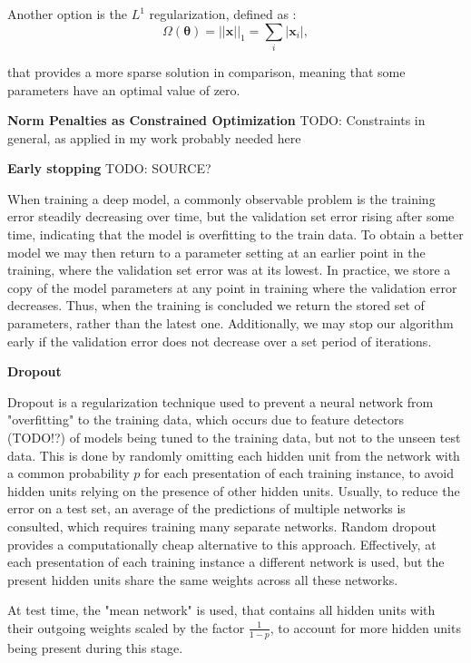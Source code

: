 Another option is the $L^1$ regularization, defined as :
\begin{equation}
    \Omega(\boldsymbol{\theta}) = ||\mathbf{x}||_1 = \sum_i |\mathbf{x}_i|,
\end{equation}

that provides a more sparse solution in comparison, meaning that some parameters have an optimal value of zero.


\textbf{Norm Penalties as Constrained Optimization}
TODO: Constraints in general, as applied in my work probably needed here

\textbf{Early stopping}
TODO: SOURCE?

When training a deep model, a commonly observable problem is the training error steadily decreasing over time, but the validation set error rising after some time, indicating that the model is overfitting to the train data. To obtain a better model we may then return to a parameter setting at an earlier point in the training, where the validation set error was at its lowest. In practice, we store a copy of the model parameters at any point in training where the validation error decreases. Thus, when the training is concluded we return the stored set of parameters, rather than the latest one. Additionally, we may stop our algorithm early if the validation error does not decrease over a set period of iterations.

\textbf{Dropout}

Dropout \cite{hinton2012improving} is a regularization technique used to prevent a neural network from "overfitting" to the training data, which occurs due to feature detectors (TODO!?) of models being tuned to the training data, but not to the unseen test data. This is done by randomly omitting each hidden unit from the network with a common probability $p$ for each presentation of each training instance, to avoid hidden units relying on the presence of other hidden units. Usually, to reduce the error on a test set, an average of the predictions of multiple networks is consulted, which requires training many separate networks. Random dropout provides a computationally cheap alternative to this approach. Effectively, at each presentation of each training instance a different network is used, but the present hidden units share the same weights across all these networks.

At test time, the "mean network" is used, that contains all hidden units with their outgoing weights scaled by the factor $\frac{1}{1-p}$, to account for more hidden units being present during this stage.

